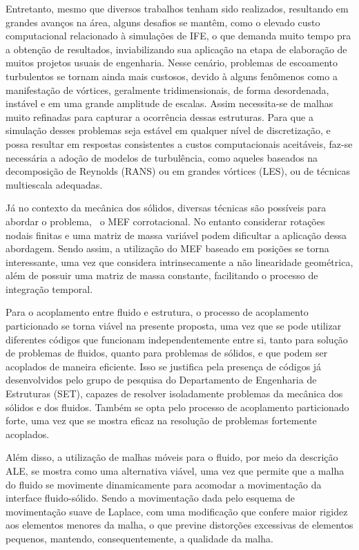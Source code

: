 Entretanto, mesmo que diversos trabalhos tenham sido realizados, resultando em grandes avanços na área, alguns desafios se mantêm, como o elevado custo computacional relacionado à simulações de IFE, o que demanda muito tempo pra a obtenção de resultados, inviabilizando sua aplicação na etapa de elaboração de muitos projetos usuais de engenharia. Nesse cenário, problemas de escoamento turbulentos se tornam ainda mais custosos, devido à alguns fenômenos como a manifestação de vórtices, geralmente tridimensionais, de forma desordenada, instável e em uma grande amplitude de escalas. Assim necessita-se de malhas muito refinadas para capturar a ocorrência dessas estruturas. Para que a simulação desses problemas seja estável em qualquer nível de discretização, e possa resultar em respostas consistentes a custos computacionais aceitáveis, faz-se necessária a adoção de modelos de turbulência, como  aqueles baseados na decomposição de Reynolds (RANS) ou em grandes vórtices (LES), ou de técnicas multiescala adequadas.

Já no contexto da mecânica dos sólidos, diversas técnicas são possíveis para abordar o problema, \eg\ o MEF corrotacional. No entanto considerar rotações nodais finitas e uma matriz de massa variável podem dificultar a aplicação dessa abordagem. Sendo assim, a utilização do MEF baseado em posições se torna interessante, uma vez que considera intrinsecamente a não linearidade geométrica, além de possuir uma matriz de massa constante, facilitando o processo de integração temporal.

Para o acoplamento entre fluido e estrutura, o processo de acoplamento particionado se torna viável na presente proposta, uma vez que se pode utilizar diferentes códigos que funcionam independentemente entre si, tanto para solução de problemas de fluidos, quanto para problemas de sólidos, e que podem ser acoplados de maneira eficiente. Isso se justifica pela presença de códigos já desenvolvidos pelo grupo de pesquisa do Departamento de Engenharia de Estruturas (SET), capazes de resolver isoladamente problemas da mecânica dos sólidos e dos fluidos. Também se opta pelo processo de acoplamento particionado forte, uma vez que se mostra eficaz na resolução de problemas fortemente acoplados.

Além disso, a utilização de malhas móveis para o fluido, por meio da descrição ALE, se mostra como uma alternativa viável, uma vez que permite que a malha do fluido se movimente dinamicamente para acomodar a movimentação da interface fluido-sólido. Sendo a movimentação dada pelo esquema de movimentação suave de Laplace, com uma modificação que confere maior rigidez aos elementos menores da malha, o que previne distorções excessivas de elementos pequenos, mantendo, consequentemente, a qualidade da malha.

